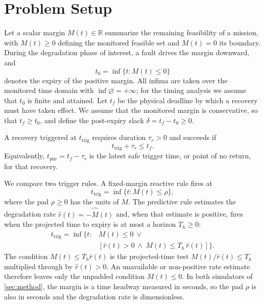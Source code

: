\section{Problem Setup}
\label{sec:setup}

Let a scalar margin $M(t)\in\mathbb R$ summarize the remaining feasibility of a
mission, with $M(t)\ge0$ defining the monitored feasible set and $M(t)=0$ its
boundary.  During the degradation phase of interest, a fault drives the margin
downward, and
\[
  t_0=\inf\{t: M(t)\le0\}
\]
denotes the expiry of the positive margin.  All infima are taken over the
monitored time domain with $\inf\varnothing=+\infty$; for the timing analysis we
assume that $t_0$ is finite and attained.  Let $t_f$ be the physical deadline by
which a recovery must have taken effect.  We assume that the monitored margin is
conservative, so that $t_f\ge t_0$, and define the post-expiry slack
$\delta=t_f-t_0\ge0$.

A recovery triggered at $t_{\mathrm{trig}}$ requires duration $\tau_r>0$ and
succeeds if
\begin{equation}
  t_{\mathrm{trig}}+\tau_r\le t_f.
  \label{eq:success}
\end{equation}
Equivalently, $t_{\mathrm{pnr}}=t_f-\tau_r$ is the latest safe trigger time, or
point of no return, for that recovery.

We compare two trigger rules.  A fixed-margin reactive rule fires at
\[
  t_{\mathrm{trig}}=\inf\{t: M(t)\le\rho\},
\]
where the pad $\rho\ge0$ has the units of $M$.  The predictive rule estimates the
degradation rate $\hat r(t)=-\widehat{\dot M}(t)$ and, when that estimate is
positive, fires when the projected time to expiry is at most a horizon
$T_h\ge0$:
\begin{equation}
  \begin{aligned}
    t_{\mathrm{trig}}=\inf\bigl\{t:{}&M(t)\le0\ \lor\\
    &[\hat r(t)>0\ \land\ M(t)\le T_h\,\hat r(t)]\bigr\}.
  \end{aligned}
  \label{eq:predictive}
\end{equation}
The condition $M(t)\le T_h\hat r(t)$ is the projected-time test
$M(t)/\hat r(t)\le T_h$ multiplied through by $\hat r(t)>0$.  An unavailable or
non-positive rate estimate therefore leaves only the unpadded condition
$M(t)\le0$.  In both simulators of \cref{sec:method}, the margin is a time
headway measured in seconds, so the pad $\rho$ is also in seconds and the
degradation rate is dimensionless.

